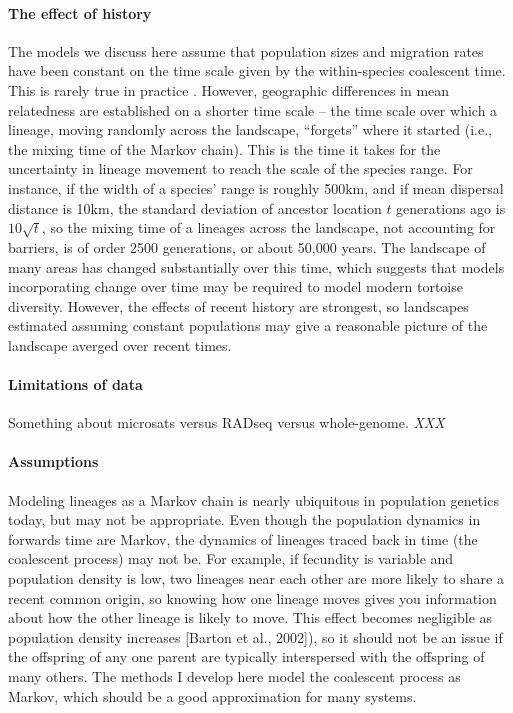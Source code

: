 \documentclass{article}
\newcommand{\plr}[1]{{\em \color{blue} #1}}
\begin{document}
\paragraph{The effect of history}
The models we discuss here assume that population sizes and migration rates
have been constant on the time scale given by the within-species coalescent time.
This is rarely true in practice \citep{avise,barton}.
However, geographic differences in mean relatedness
are established on a shorter time scale --
the time scale over which a lineage, moving randomly across the landscape,
``forgets'' where it started
(i.e., the mixing time of the Markov chain).
This is the time it takes for the uncertainty in lineage movement
to reach the scale of the species range.
For instance,
if the width of a species' range is roughly 500km,
and if mean dispersal distance is 10km,
the standard deviation of ancestor location $t$ generations ago is $10\sqrt{t}$,
so the mixing time of a lineages across the landscape,
not accounting for barriers, is of order 2500 generations,
or about 50,000 years.
The landscape of many areas has changed substantially over this time, %
which suggests that models incorporating change over time 
may be required to model modern tortoise diversity.
However, the effects of recent history are strongest,
so landscapes estimated assuming constant populations
may give a reasonable picture of the landscape averged over recent times.

\paragraph{Limitations of data}
Something about microsats versus RADseq versus whole-genome.
\plr{XXX}


\paragraph{Assumptions}
Modeling lineages as a Markov chain is nearly ubiquitous in population genetics today,
but may not be appropriate.
Even though the population dynamics in forwards time are Markov, the dynamics of lineages traced back
in time (the coalescent process) may not be. For example, if fecundity is variable and population density
is low, two lineages near each other are more likely to share a recent common origin, so knowing how one
lineage moves gives you information about how the other lineage is likely to move. This effect becomes
negligible as population density increases [Barton et al., 2002]), so it should not be an issue if the offspring
of any one parent are typically interspersed with the offspring of many others. The methods I develop here
model the coalescent process as Markov, which should be a good approximation for many systems.
\end{document}
